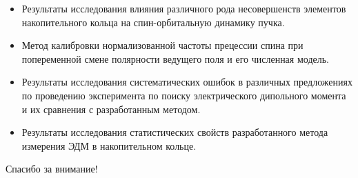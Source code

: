 \documentclass[14pt]{beamer}
\begin{document}
\begin{frame}
	\begin{itemize}
		\item Результаты исследования влияния различного рода несовершенств элементов накопительного кольца 
		на спин-орбитальную динамику пучка. 
		\item Метод калибровки нормализованной частоты прецессии спина при попеременной смене полярности ведущего поля и его численная модель.
		\item Результаты исследования систематических ошибок в различных предложениях по проведению эксперимента по поиску электрического дипольного момента и их сравнения с разработанным методом. 
		\item Результаты исследования статистических свойств разработанного метода измерения ЭДМ	в накопительном кольце.
	\end{itemize}
\end{frame}

\begin{frame}
\begin{center}
Спасибо за внимание!
\end{center}
\end{frame}

\end{document}
